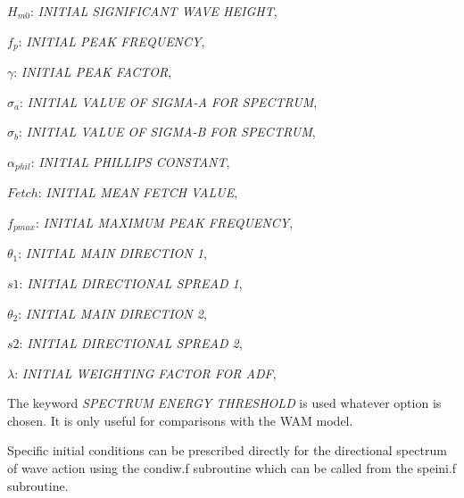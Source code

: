  $H_{m0}$: \textit{INITIAL SIGNIFICANT WAVE HEIGHT},

 $f_p$:  \textit{INITIAL PEAK FREQUENCY},

 $\gamma$:  \textit{INITIAL PEAK FACTOR},

 $\sigma_a$:  \textit{INITIAL VALUE OF SIGMA-A FOR SPECTRUM},

 $\sigma_b$:  \textit{INITIAL VALUE OF SIGMA-B FOR SPECTRUM},

 $\alpha_{phil}$:  \textit{INITIAL PHILLIPS CONSTANT},

 $Fetch$:  \textit{INITIAL MEAN FETCH VALUE},

 $f_{pmax}$:  \textit{INITIAL MAXIMUM PEAK FREQUENCY},

 $\theta_1$:  \textit{INITIAL MAIN DIRECTION 1},

 $s1$:  \textit{INITIAL DIRECTIONAL SPREAD 1},

 $\theta_2$:  \textit{INITIAL MAIN DIRECTION 2},

 $s2$:  \textit{INITIAL DIRECTIONAL SPREAD 2},

 $\lambda$:  \textit{INITIAL WEIGHTING FACTOR FOR ADF},


 The keyword \textit{SPECTRUM ENERGY THRESHOLD} is used whatever option is chosen. It is only useful for comparisons with the WAM model.

 Specific initial conditions can be prescribed directly for the directional spectrum of wave action using the condiw.f subroutine which can be called from the speini.f subroutine.

